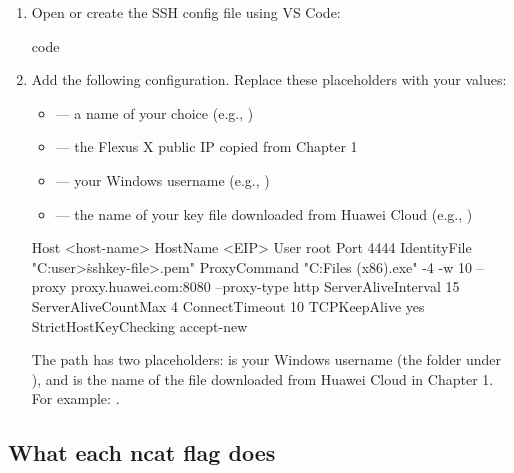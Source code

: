 \documentclass{guide}
\begin{document}
\stepbystep
\begin{enumerate}
  \item Open or create the SSH config file using VS Code:

  \begin{code}[bash]
code %
  \end{code}

  \item Add the following configuration. Replace these placeholders with your
        values:
        \begin{itemize}
          \item {} --- a name of your choice (e.g., )
          \item {} --- the Flexus X public IP copied from Chapter 1
          \item {} --- your Windows username (e.g., )
          \item {} --- the name of your  key file
                downloaded from Huawei Cloud (e.g., )
        \end{itemize}

  \begin{code}
Host <host-name>
    HostName <EIP>
    User root
    Port 4444
    IdentityFile "C:\Users\<user>\.ssh\<key-file>.pem"
    ProxyCommand "C:\Program Files (x86)\Nmap\ncat.exe" -4 -w 10 --proxy proxy.huawei.com:8080 --proxy-type http %
    ServerAliveInterval 15
    ServerAliveCountMax 4
    ConnectTimeout 10
    TCPKeepAlive yes
    StrictHostKeyChecking accept-new
  \end{code}

  \begin{infobox}
  The  path has two placeholders:
   is your Windows username (the folder under
  ), and 
  is the name of the  file downloaded from Huawei Cloud
  in Chapter 1. For example:
  .
  \end{infobox}
\end{enumerate}

\subsection{What each ncat flag does}
\end{document}
